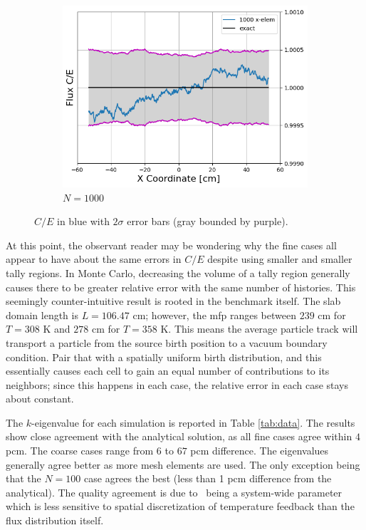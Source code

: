\documentclass[letterpaper]{mc2023}
\begin{document}
\begin{figure}[H]
\begin{subfigure}{0.405\textwidth}
        \includegraphics[width=\linewidth]{figures/1000_flux_CE_error_bars}
        \caption{$N=1000$}
        \label{fig:s5}
    \end{subfigure}
    \par\medskip
    \caption{$C/E$ in blue with $2\sigma$ error bars (gray bounded by purple).}
\label{fig:ce_error_bars}
\end{figure}

At this point, the observant reader may be wondering why the fine cases all appear to have about the same errors in $C/E$ despite using smaller and
smaller tally regions. In Monte Carlo, decreasing the volume of a tally region generally causes there to be greater relative error with the same number
of histories. This seemingly counter-intuitive result is rooted in the benchmark itself. The slab domain length is $L=106.47$ cm; however, the \gls{mfp}
ranges between $239$ cm for $T=308$ K and $278$ cm for $T=358$ K. This means the average particle track will transport a particle from the source birth
position to a vacuum boundary condition. Pair that with a spatially uniform birth distribution, and this essentially causes each cell to gain an equal
number of contributions to its neighbors; since this happens in each case, the relative error in each case stays about constant.

The $k$-eigenvalue for each simulation is reported in Table \ref{tab:data}. The results show close agreement with the analytical solution, as all
fine cases agree within $4$ pcm. The coarse cases range from $6$ to $67$ pcm difference. The eigenvalues generally agree better as more mesh elements
are used. The only exception being that the $N=100$ case agrees the best (less than 1 pcm difference from the analytical). The quality agreement is due to
\keff\ being a system-wide parameter which is less sensitive to spatial discretization of temperature feedback than the flux distribution itself.
\end{document}
